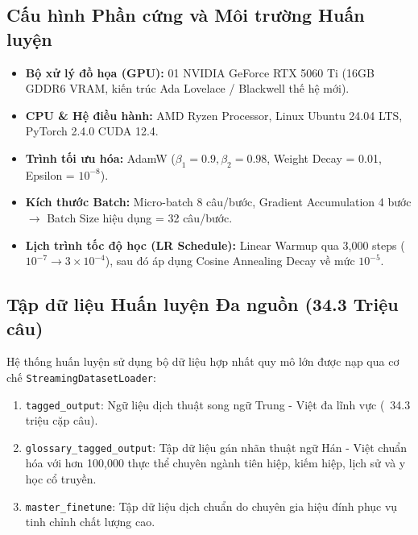 \documentclass{uetgraduation}
\begin{document}
\subsection{Cấu hình Phần cứng và Môi trường Huấn luyện}
\begin{itemize}
    \item \textbf{Bộ xử lý đồ họa (GPU):} 01 NVIDIA GeForce RTX 5060 Ti (16GB GDDR6 VRAM, kiến trúc Ada Lovelace / Blackwell thế hệ mới).
    \item \textbf{CPU \& Hệ điều hành:} AMD Ryzen Processor, Linux Ubuntu 24.04 LTS, PyTorch 2.4.0 CUDA 12.4.
    \item \textbf{Trình tối ưu hóa:} AdamW ($\beta_1=0.9, \beta_2=0.98$, Weight Decay = 0.01, Epsilon = $10^{-8}$).
    \item \textbf{Kích thước Batch:} Micro-batch 8 câu/bước, Gradient Accumulation 4 bước $\rightarrow$ Batch Size hiệu dụng = 32 câu/bước.
    \item \textbf{Lịch trình tốc độ học (LR Schedule):} Linear Warmup qua 3,000 steps ($10^{-7} \rightarrow 3 \times 10^{-4}$), sau đó áp dụng Cosine Annealing Decay về mức $10^{-5}$.
\end{itemize}

\subsection{Tập dữ liệu Huấn luyện Đa nguồn (34.3 Triệu câu)}
Hệ thống huấn luyện sử dụng bộ dữ liệu hợp nhất quy mô lớn được nạp qua cơ chế \texttt{StreamingDatasetLoader}:
\begin{enumerate}
    \item \texttt{tagged\_output}: Ngữ liệu dịch thuật song ngữ Trung - Việt đa lĩnh vực (~34.3 triệu cặp câu).
    \item \texttt{glossary\_tagged\_output}: Tập dữ liệu gán nhãn thuật ngữ Hán - Việt chuẩn hóa với hơn 100,000 thực thể chuyên ngành tiên hiệp, kiếm hiệp, lịch sử và y học cổ truyền.
    \item \texttt{master\_finetune}: Tập dữ liệu dịch chuẩn do chuyên gia hiệu đính phục vụ tinh chỉnh chất lượng cao.
\end{enumerate}
\end{document}
